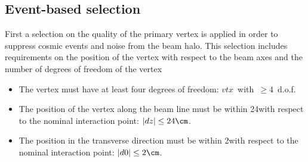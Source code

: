 \subsection{Event-based selection}
\label{sec:EventBasedSelection}
First a selection on the quality of the primary vertex is applied in order to suppress cosmic events and noise from the beam halo.
This selection includes requirements on the position of the vertex with respect to the beam axes and the number of degrees of freedom of the vertex~\cite{bib:CMS:Tracking_7TeV_PAS} %
\begin{itemize}
\renewcommand{\labelitemi}{\footnotesize{\ding{118}}}
\item The vertex must have at least four degrees of freedom: \mbox{$vtx$ with $\geq 4$ d.o.f.}
\item The position of the vertex along the beam line must be within 24\cm with respect to the nominal interaction point: \mbox{$|dz| \leq 24\cm$.}
\item The position in the transverse direction must be within 2\cm with respect to the nominal interaction point: \mbox{$|d0| \leq 2\cm$.}\\
\end{itemize}

